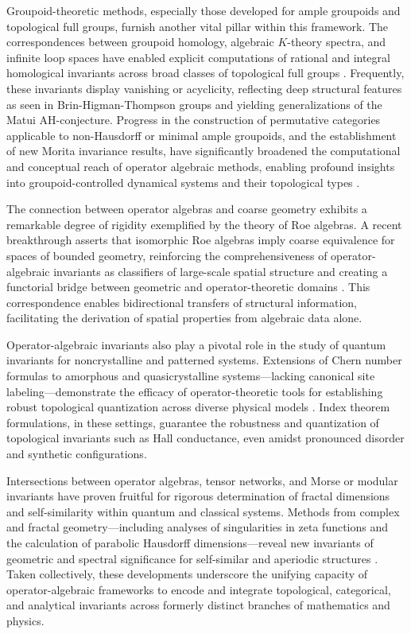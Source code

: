 \documentclass[sigconf]{acmart}
\begin{document}
Groupoid-theoretic methods, especially those developed for ample groupoids and topological full groups, furnish another vital pillar within this framework. The correspondences between groupoid homology, algebraic $K$-theory spectra, and infinite loop spaces have enabled explicit computations of rational and integral homological invariants across broad classes of topological full groups \cite{ref22}. Frequently, these invariants display vanishing or acyclicity, reflecting deep structural features as seen in Brin-Higman-Thompson groups and yielding generalizations of the Matui AH-conjecture. Progress in the construction of permutative categories applicable to non-Hausdorff or minimal ample groupoids, and the establishment of new Morita invariance results, have significantly broadened the computational and conceptual reach of operator algebraic methods, enabling profound insights into groupoid-controlled dynamical systems and their topological types \cite{ref22,ref23}.

The connection between operator algebras and coarse geometry exhibits a remarkable degree of rigidity exemplified by the theory of Roe algebras. A recent breakthrough asserts that isomorphic Roe algebras imply coarse equivalence for spaces of bounded geometry, reinforcing the comprehensiveness of operator-algebraic invariants as classifiers of large-scale spatial structure and creating a functorial bridge between geometric and operator-theoretic domains \cite{ref34}. This correspondence enables bidirectional transfers of structural information, facilitating the derivation of spatial properties from algebraic data alone.

Operator-algebraic invariants also play a pivotal role in the study of quantum invariants for noncrystalline and patterned systems. Extensions of Chern number formulas to amorphous and quasicrystalline systems—lacking canonical site labeling—demonstrate the efficacy of operator-theoretic tools for establishing robust topological quantization across diverse physical models \cite{ref25}. Index theorem formulations, in these settings, guarantee the robustness and quantization of topological invariants such as Hall conductance, even amidst pronounced disorder and synthetic configurations.

Intersections between operator algebras, tensor networks, and Morse or modular invariants have proven fruitful for rigorous determination of fractal dimensions and self-similarity within quantum and classical systems. Methods from complex and fractal geometry—including analyses of singularities in zeta functions and the calculation of parabolic Hausdorff dimensions—reveal new invariants of geometric and spectral significance for self-similar and aperiodic structures \cite{ref2,ref19,ref14}. Taken collectively, these developments underscore the unifying capacity of operator-algebraic frameworks to encode and integrate topological, categorical, and analytical invariants across formerly distinct branches of mathematics and physics.
\end{document}
